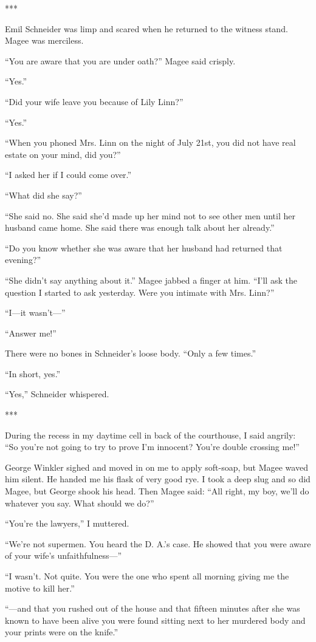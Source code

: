 {***

Emil Schneider was limp and scared when he returned to the witness stand. Magee was merciless.

“You are aware that you are under oath?” Magee said crisply.

“Yes.”

“Did your wife leave you because of Lily Linn?”

“Yes.”

“When you phoned Mrs. Linn on the night of July 21st, you did not have real estate on your mind, did you?”

“I asked her if I could come over.”

“What did she say?”

“She said no. She said she’d made up her mind not to see other men until her husband came home. She said there was enough talk about her already.”

“Do you know whether she was aware that her husband had returned that evening?”

“She didn’t say anything about it.” Magee jabbed a finger at him. “I’ll ask the question I started to ask yesterday. Were you intimate with Mrs. Linn?”

“I—it wasn’t—”

“Answer me!”

There were no bones in Schneider’s loose body. “Only a few times.”

“In short, yes.”

“Yes,” Schneider whispered.

***

During the recess in my daytime cell in back of the courthouse, I said angrily: “So you’re not going to try to prove I’m innocent? You’re double crossing me!”

George Winkler sighed and moved in on me to apply soft-soap, but Magee waved him silent. He handed me his flask of very good rye. I took a deep slug and so did Magee, but George shook his head. Then Magee said: “All right, my boy, we’ll do whatever you say. What should we do?”

“You’re the lawyers,” I muttered.

“We’re not supermen. You heard the D. A.’s case. He showed that you were aware of your wife’s unfaithfulness—”

“I wasn’t. Not quite. You were the one who spent all morning giving me the motive to kill her.”

“—and that you rushed out of the house and that fifteen minutes after she was known to have been alive you were found sitting next to her murdered body and your prints were on the knife.”

}
